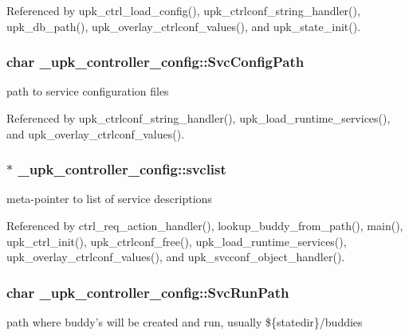 Referenced by upk\_\-ctrl\_\-load\_\-config(), upk\_\-ctrlconf\_\-string\_\-handler(), upk\_\-db\_\-path(), upk\_\-overlay\_\-ctrlconf\_\-values(), and upk\_\-state\_\-init().

\subsubsection[{SvcConfigPath}]{\setlength{\rightskip}{0pt plus 5cm}char {\bf \_\-upk\_\-controller\_\-config::SvcConfigPath}}\label{struct__upk__controller__config_a6b31731067b25f92c5ac81b6ef12b4af}
path to service configuration files 

Referenced by upk\_\-ctrlconf\_\-string\_\-handler(), upk\_\-load\_\-runtime\_\-services(), and upk\_\-overlay\_\-ctrlconf\_\-values().

\subsubsection[{svclist}]{ $\ast$ {\bf \_\-upk\_\-controller\_\-config::svclist}}\label{struct__upk__controller__config_a57ba77b4bf24c5b27d41fe1f2d5fbea3}
meta-\/pointer to list of service descriptions 

Referenced by ctrl\_\-req\_\-action\_\-handler(), lookup\_\-buddy\_\-from\_\-path(), main(), upk\_\-ctrl\_\-init(), upk\_\-ctrlconf\_\-free(), upk\_\-load\_\-runtime\_\-services(), upk\_\-overlay\_\-ctrlconf\_\-values(), and upk\_\-svcconf\_\-object\_\-handler().

\subsubsection[{SvcRunPath}]{\setlength{\rightskip}{0pt plus 5cm}char {\bf \_\-upk\_\-controller\_\-config::SvcRunPath}}\label{struct__upk__controller__config_a46d18b02c6a37c6408b006fbcec3a459}
path where buddy's will be created and run, usually \$\{statedir\}/buddies 

